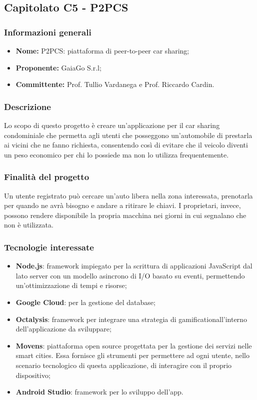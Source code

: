 \subsection{Capitolato C5 - P2PCS}
\subsubsection{Informazioni generali}
\begin{itemize}
\item \textbf{Nome:} P2PCS: piattaforma di peer-to-peer car sharing;
\item \textbf{Proponente:} GaiaGo S.r.l;
\item \textbf{Committente:} Prof. Tullio Vardanega e Prof. Riccardo Cardin.
\end{itemize}
\subsubsection{Descrizione}
Lo scopo di questo progetto è creare un'applicazione per il car sharing 
condominiale che permetta agli utenti che posseggono un'automobile di prestarla 
ai vicini che ne fanno richiesta, consentendo così di evitare che il veicolo 
diventi un peso economico per chi lo possiede ma non lo utilizza frequentemente.

\subsubsection{Finalità del progetto}
Un utente registrato può cercare un'auto libera nella zona interessata, 
prenotarla per quando ne avrà bisogno e andare a ritirare le chiavi. I 
proprietari, invece, possono rendere disponibile la propria macchina nei giorni in cui segnalano che non è utilizzata.

\subsubsection{Tecnologie interessate}
\begin{itemize}
	\item \textbf{Node.js}: framework impiegato per la scrittura di applicazioni 
JavaScript dal lato server con un modello asincrono di I/O basato su eventi, 
permettendo un'ottimizzazione di tempi e risorse;
	\item \textbf{Google Cloud}: per la gestione del database;
	\item \textbf{Octalysis}: framework per integrare una strategia di gamification\glosp all'interno dell'applicazione da sviluppare;
	\item \textbf{Movens}: piattaforma open source progettata per la gestione dei servizi nelle smart cities. Essa fornisce gli strumenti per permettere ad ogni	utente, nello scenario tecnologico di questa applicazione, di interagire con il proprio dispositivo;
	\item \textbf{Android Studio}: framework per lo sviluppo dell'app.
\end{itemize}

